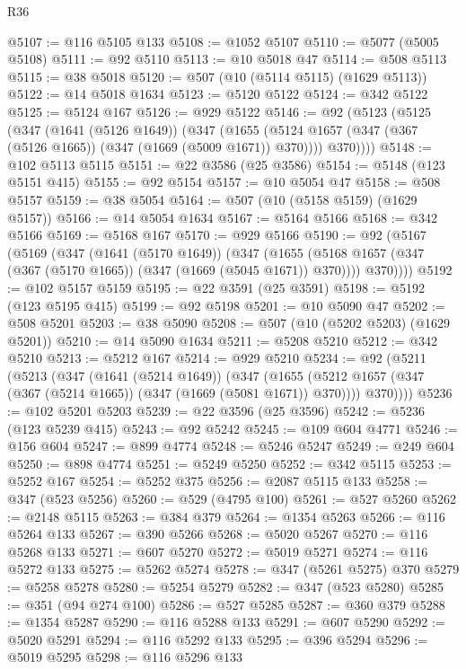 \begin{lexlean}{R36}
\begin{coremodule}
@5107 := @116 @5105 @133
@5108 := @1052 @5107
@5110 := @5077 (@5005 @5108)
@5111 := @92 @5110
@5113 := @10 @5018 @47
@5114 := @508 @5113
@5115 := @38 @5018
@5120 := @507 (@10 (@5114 @5115) (@1629 @5113))
@5122 := @14 @5018 @1634
@5123 := @5120 @5122
@5124 := @342 @5122
@5125 := @5124 @167
@5126 := @929 @5122
@5146 := @92
    (@5123
      (@5125
        (@347
          (@1641 (@5126 @1649))
          (@347
            (@1655 (@5124 @1657 (@347 (@367 (@5126 @1665)) (@347 (@1669 (@5009 @1671)) @370))))
            @370))))
@5148 := @102 @5113 @5115
@5151 := @22 @3586 (@25 @3586)
@5154 := @5148 (@123 @5151 @415)
@5155 := @92 @5154
@5157 := @10 @5054 @47
@5158 := @508 @5157
@5159 := @38 @5054
@5164 := @507 (@10 (@5158 @5159) (@1629 @5157))
@5166 := @14 @5054 @1634
@5167 := @5164 @5166
@5168 := @342 @5166
@5169 := @5168 @167
@5170 := @929 @5166
@5190 := @92
    (@5167
      (@5169
        (@347
          (@1641 (@5170 @1649))
          (@347
            (@1655 (@5168 @1657 (@347 (@367 (@5170 @1665)) (@347 (@1669 (@5045 @1671)) @370))))
            @370))))
@5192 := @102 @5157 @5159
@5195 := @22 @3591 (@25 @3591)
@5198 := @5192 (@123 @5195 @415)
@5199 := @92 @5198
@5201 := @10 @5090 @47
@5202 := @508 @5201
@5203 := @38 @5090
@5208 := @507 (@10 (@5202 @5203) (@1629 @5201))
@5210 := @14 @5090 @1634
@5211 := @5208 @5210
@5212 := @342 @5210
@5213 := @5212 @167
@5214 := @929 @5210
@5234 := @92
    (@5211
      (@5213
        (@347
          (@1641 (@5214 @1649))
          (@347
            (@1655 (@5212 @1657 (@347 (@367 (@5214 @1665)) (@347 (@1669 (@5081 @1671)) @370))))
            @370))))
@5236 := @102 @5201 @5203
@5239 := @22 @3596 (@25 @3596)
@5242 := @5236 (@123 @5239 @415)
@5243 := @92 @5242
@5245 := @109 @604 @4771
@5246 := @156 @604
@5247 := @899 @4774
@5248 := @5246 @5247
@5249 := @249 @604
@5250 := @898 @4774
@5251 := @5249 @5250
@5252 := @342 @5115
@5253 := @5252 @167
@5254 := @5252 @375
@5256 := @2087 @5115 @133
@5258 := @347 (@523 @5256)
@5260 := @529 (@4795 @100)
@5261 := @527 @5260
@5262 := @2148 @5115
@5263 := @384 @379
@5264 := @1354 @5263
@5266 := @116 @5264 @133
@5267 := @390 @5266
@5268 := @5020 @5267
@5270 := @116 @5268 @133
@5271 := @607 @5270
@5272 := @5019 @5271
@5274 := @116 @5272 @133
@5275 := @5262 @5274
@5278 := @347 (@5261 @5275) @370
@5279 := @5258 @5278
@5280 := @5254 @5279
@5282 := @347 (@523 @5280)
@5285 := @351 (@94 @274 @100)
@5286 := @527 @5285
@5287 := @360 @379
@5288 := @1354 @5287
@5290 := @116 @5288 @133
@5291 := @607 @5290
@5292 := @5020 @5291
@5294 := @116 @5292 @133
@5295 := @396 @5294
@5296 := @5019 @5295
@5298 := @116 @5296 @133

\end{coremodule}
\end{lexlean}
